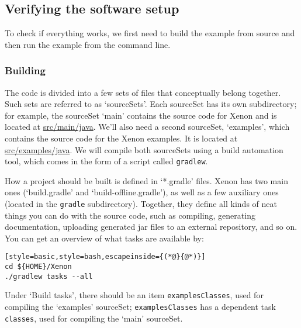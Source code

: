 
\subsection{Verifying the software setup}

To check if everything works, we first need to build the example from source and then run the example from the command line.

\subsubsection{Building}

The code is divided into a few sets of files that conceptually belong together. Such sets are referred to as `sourceSets'. Each sourceSet has its own subdirectory; for example, the sourceSet `main' contains the source code for Xenon and is located at \url{src/main/java}. We'll also need a second sourceSet, `examples', which contains the source code for the Xenon examples. It is located at \url{src/examples/java}. We will compile both sourceSets using a build automation tool, which comes in the form of a script called \texttt{gradlew}.

How a project should be built is defined in `*.gradle' files. Xenon has two main ones (`build.gradle' and `build-offline.gradle'), as well as a few auxiliary ones (located in the \texttt{gradle} subdirectory). Together, they define all kinds of neat things you can do with the source code, such as compiling, generating documentation, uploading generated jar files to an external repository, and so on. You can get an overview of what tasks are available by:

\begin{lstlisting}[style=basic,style=bash,escapeinside={(*@}{@*)}]
cd ${HOME}/Xenon
./gradlew tasks --all
\end{lstlisting} %

Under `Build tasks', there should be an item \texttt{examplesClasses}, used for compiling the `examples' sourceSet; \texttt{examplesClasses} has a dependent task \texttt{classes}, used for compiling the `main' sourceSet.

